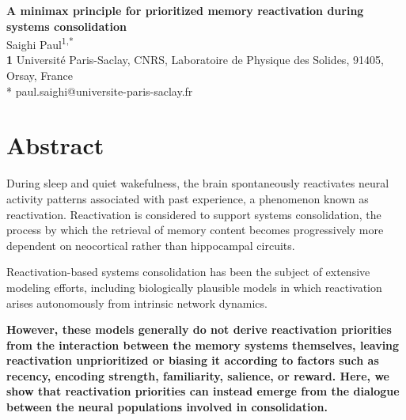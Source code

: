 \documentclass[10pt,letterpaper]{article}
\theoremstyle{plain}
\theoremstyle{remark}
\begin{document}
\begin{flushleft}
{\Large\textbf{A minimax principle for prioritized memory reactivation during systems consolidation}}
\newline\\
Saighi Paul\textsuperscript{1,*}
\\
\bigskip
\textbf{1} Universit\'e Paris-Saclay, CNRS, Laboratoire de Physique des Solides, 91405, Orsay, France\\
\bigskip
* paul.saighi@universite-paris-saclay.fr
\end{flushleft}


\section*{Abstract}

During sleep and quiet wakefulness, the brain spontaneously reactivates neural activity patterns associated with past experience, a phenomenon known as reactivation. Reactivation is considered to support systems consolidation, the process by which the retrieval of memory content becomes progressively more dependent on neocortical rather than hippocampal circuits.

Reactivation-based systems consolidation has been the subject of extensive modeling efforts, including biologically plausible models in which reactivation arises autonomously from intrinsic network dynamics.

\textbf{However, these models generally do not derive reactivation priorities from the interaction between the memory systems themselves, leaving reactivation unprioritized or biasing it according to factors such as recency, encoding strength, familiarity, salience, or reward. Here, we show that reactivation priorities can instead emerge from the dialogue between the neural populations involved in consolidation.}
\end{document}
